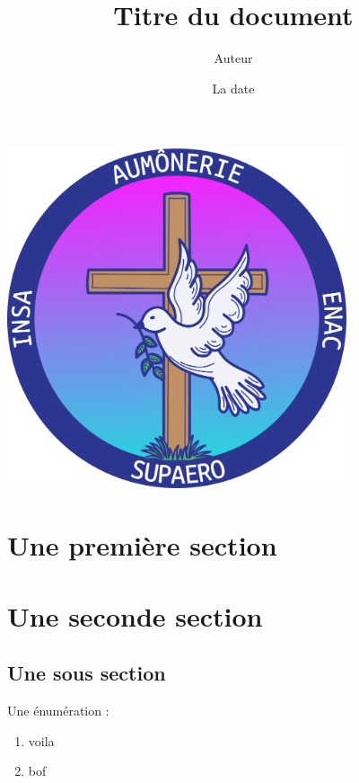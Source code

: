 \documentclass[10pt]{article}
\title{Titre du document}
\author{Auteur}
\date{La date}
\begin{document}
    \maketitle
    \begin{center}
    \includegraphics[width=10cm]{logoAumonerie.png}
    \end{center}
    \begin{center}
    \end{center}
    \newpage
    \AddToShipoutPicture{\BackgroundPic} 
    \fontsize{12}{12}\selectfont
    \tableofcontents %
    \newpage %
    
    \section{Une première section}
    
    \section{Une seconde section}
    
    \subsection{Une sous section}

    Une énumération :
    \begin{enumerate}
        \item voila
        \item bof
    \end{enumerate}
\end{document}
